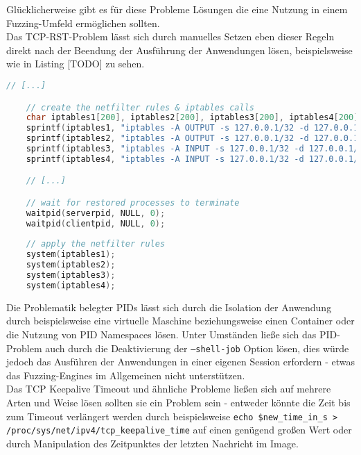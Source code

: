 \documentclass[a4paper]{article}
\begin{document}
Glücklicherweise gibt es für diese Probleme Lösungen die eine Nutzung in einem Fuzzing-Umfeld ermöglichen sollten.\\
Das TCP-RST-Problem lässt sich durch manuelles Setzen eben dieser Regeln direkt nach der Beendung der Ausführung der Anwendungen lösen, beispielsweise wie in Listing [TODO] zu sehen.
\begin{lstlisting}[caption=Setzen der Firewallregeln, language=C]
    // [...]

    // create the netfilter rules & iptables calls
    char iptables1[200], iptables2[200], iptables3[200], iptables4[200];
    sprintf(iptables1, "iptables -A OUTPUT -s 127.0.0.1/32 -d 127.0.0.1/32 -p tcp -m mark ! --mark 0xc114 -m tcp --sport %i --dport %i -j DROP", clientport, serverport);
    sprintf(iptables2, "iptables -A OUTPUT -s 127.0.0.1/32 -d 127.0.0.1/32 -p tcp -m mark ! --mark 0xc114 -m tcp --sport %i --dport %i -j DROP", serverport, clientport);
    sprintf(iptables3, "iptables -A INPUT -s 127.0.0.1/32 -d 127.0.0.1/32 -p tcp -m mark ! --mark 0xc114 -m tcp --sport %i --dport %i -j DROP", clientport, serverport);
    sprintf(iptables4, "iptables -A INPUT -s 127.0.0.1/32 -d 127.0.0.1/32 -p tcp -m mark ! --mark 0xc114 -m tcp --sport %i --dport %i -j DROP", serverport, clientport);

    // [...]

    // wait for restored processes to terminate
    waitpid(serverpid, NULL, 0);
    waitpid(clientpid, NULL, 0);
    
    // apply the netfilter rules
    system(iptables1);
    system(iptables2);
    system(iptables3);
    system(iptables4);
\end{lstlisting}
Die Problematik belegter PIDs lässt sich durch die Isolation der Anwendung durch beispielsweise eine virtuelle Maschine beziehungsweise einen Container oder die Nutzung von PID Namespaces lösen. 
Unter Umständen ließe sich das PID-Problem auch durch die Deaktivierung der \texttt{--shell-job} Option lösen, dies würde jedoch das Ausführen der Anwendungen in einer eigenen Session erfordern - etwas das Fuzzing-Engines im Allgemeinen nicht unterstützen.\\
Das TCP Keepalive Timeout und ähnliche Probleme ließen sich auf mehrere Arten und Weise lösen sollten sie ein Problem sein - entweder könnte die Zeit bis zum Timeout verlängert werden durch beispielsweise \texttt{echo \$new\_time\_in\_s > /proc/sys/net/ipv4/tcp\_keepalive\_time} auf einen genügend großen Wert oder durch Manipulation des Zeitpunktes der letzten Nachricht im Image.
\end{document}
